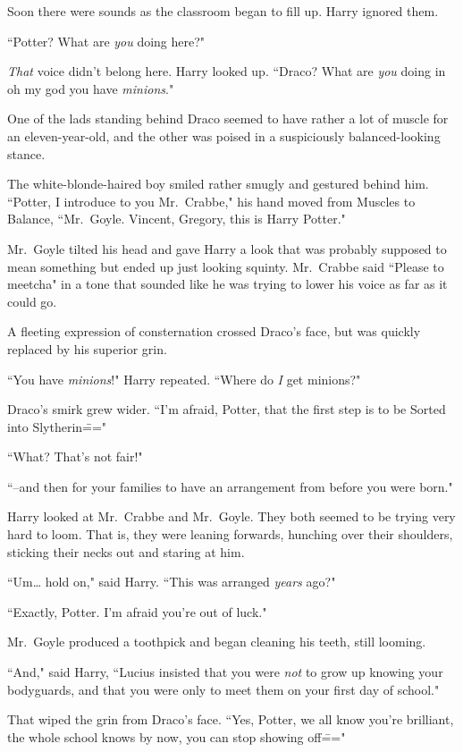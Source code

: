 Soon there were sounds as the classroom began to fill up. Harry ignored them.

``Potter? What are \emph{you} doing here?"

\emph{That} voice didn't belong here. Harry looked up. ``Draco? What are \emph{you} doing in oh my god you have \emph{minions}."

One of the lads standing behind Draco seemed to have rather a lot of muscle for an eleven-year-old, and the other was poised in a suspiciously balanced-looking stance.

The white-blonde-haired boy smiled rather smugly and gestured behind him. ``Potter, I introduce to you Mr.~Crabbe," his hand moved from Muscles to Balance, ``Mr.~Goyle. Vincent, Gregory, this is Harry Potter."

Mr.~Goyle tilted his head and gave Harry a look that was probably supposed to mean something but ended up just looking squinty. Mr.~Crabbe said ``Please to meetcha" in a tone that sounded like he was trying to lower his voice as far as it could go.

A fleeting expression of consternation crossed Draco's face, but was quickly replaced by his superior grin.

``You have \emph{minions}!" Harry repeated. ``Where do \emph{I} get minions?"

Draco's smirk grew wider. ``I'm afraid, Potter, that the first step is to be Sorted into Slytherin\==="

``What? That's not fair!"

``\---and then for your families to have an arrangement from before you were born."

Harry looked at Mr.~Crabbe and Mr.~Goyle. They both seemed to be trying very hard to loom. That is, they were leaning forwards, hunching over their shoulders, sticking their necks out and staring at him.

``Um{\ldots} hold on," said Harry. ``This was arranged \emph{years} ago?"

``Exactly, Potter. I'm afraid you're out of luck."

Mr.~Goyle produced a toothpick and began cleaning his teeth, still looming.

``And," said Harry, ``Lucius insisted that you were \emph{not} to grow up knowing your bodyguards, and that you were only to meet them on your first day of school."

That wiped the grin from Draco's face. ``Yes, Potter, we all know you're brilliant, the whole school knows by now, you can stop showing off\==="

